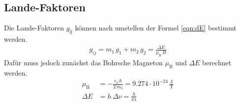 \subsection{Lande-Faktoren}
Die Lande-Faktoren $g_\text{ij}$ können nach umstellen der Formel \eqref{eqn:dE} bestimmt werden.
\begin{align}
  g_{ij} = m_1\,g_1 + m_2\,g_2 = \frac{\Delta E}{\mu_\text{B}\,B}
\end{align}
Dafür muss jedoch zunächst das Bohrsche Magneton $\mu_\text{B}$ und $\Delta E$ berechnet werden.
\begin{align}
  \mu_\text{B} &= - \frac{e_0\, \hbar}{2\, m_0} = 9.274 \cdot 10^{-24}\, \frac{\text{J}}{\text{T}}\\
  \Delta E &= h\,\Delta\nu = \frac{h}{\delta\lambda}
\end{align}




























%
